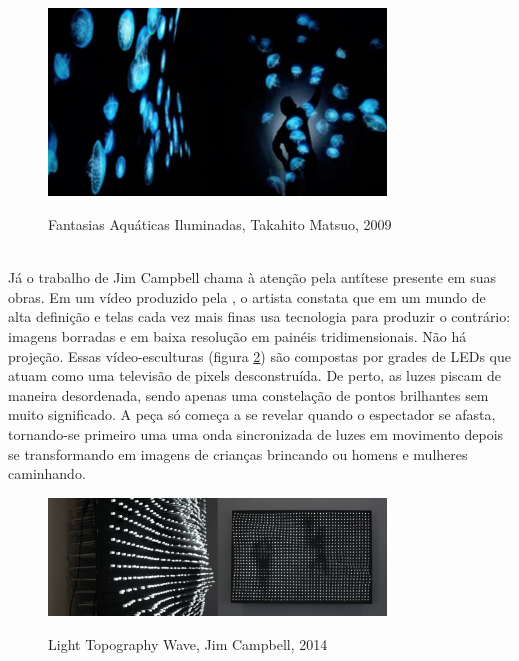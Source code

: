 \begin{figure}[H]
    \centering
    \caption{Fantasias Aquáticas Iluminadas, Takahito Matsuo, 2009}
	\vspace*{0,2cm}
    \includegraphics[width=0.8\textwidth]{./04-figuras/takahito_matsuo}
    \label{fig:takahito_matsuo}
\end{figure}
\vspace*{-0,9cm}
{\raggedright {}}\\

Já o trabalho de Jim Campbell chama à atenção pela antítese presente em suas obras. Em um vídeo produzido pela , o artista constata que em um mundo de alta definição e telas cada vez mais finas usa tecnologia para produzir o contrário: imagens borradas e em baixa resolução em painéis tridimensionais. Não há projeção. Essas vídeo-esculturas (figura \ref{fig:jim_campbell}) são compostas por grades de LEDs que atuam como uma televisão de pixels desconstruída. De perto, as luzes piscam de maneira desordenada, sendo apenas uma constelação de pontos brilhantes sem muito significado. A peça só começa a se revelar quando o espectador se afasta, tornando-se primeiro uma uma onda sincronizada de luzes em movimento depois se transformando em imagens de crianças brincando ou homens e mulheres caminhando. 

\begin{figure}[H]
    \centering
    \caption{Light Topography Wave, Jim Campbell, 2014}
	\vspace*{0,2cm}
    \includegraphics[width=0.8\textwidth]{./04-figuras/jim_campbell}
    \label{fig:jim_campbell}
\end{figure}
\vspace*{-0,9cm}
{\raggedright {}}\\

